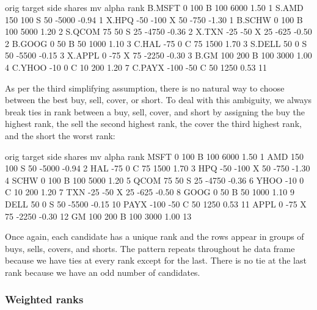 \documentclass{article}
\begin{document}
\begin{Schunk}
\begin{Soutput}
       orig target side shares    mv alpha rank
B.MSFT    0    100    B    100  6000  1.50    1
S.AMD   150    100    S     50 -5000 -0.94    1
X.HPQ   -50   -100    X     50  -750 -1.30    1
B.SCHW    0    100    B    100  5000  1.20    2
S.QCOM   75     50    S     25 -4750 -0.36    2
X.TXN   -25    -50    X     25  -625 -0.50    2
B.GOOG    0     50    B     50  1000  1.10    3
C.HAL   -75      0    C     75  1500  1.70    3
S.DELL   50      0    S     50 -5500 -0.15    3
X.APPL    0    -75    X     75 -2250 -0.30    3
B.GM    100    200    B    100  3000  1.00    4
C.YHOO  -10      0    C     10   200  1.20    7
C.PAYX -100    -50    C     50  1250  0.53   11
\end{Soutput}
\end{Schunk}

As per the third simplifying assumption, there is no natural way to
choose between the best buy, sell, cover, or short.  To deal with this
ambiguity, we always break ties in rank between a buy, sell, cover,
and short by assigning the buy the highest rank, the sell the second
highest rank, the cover the third highest rank, and the short the
worst rank:

\begin{Schunk}
\begin{Soutput}
     orig target side shares    mv alpha rank
MSFT    0    100    B    100  6000  1.50    1
AMD   150    100    S     50 -5000 -0.94    2
HAL   -75      0    C     75  1500  1.70    3
HPQ   -50   -100    X     50  -750 -1.30    4
SCHW    0    100    B    100  5000  1.20    5
QCOM   75     50    S     25 -4750 -0.36    6
YHOO  -10      0    C     10   200  1.20    7
TXN   -25    -50    X     25  -625 -0.50    8
GOOG    0     50    B     50  1000  1.10    9
DELL   50      0    S     50 -5500 -0.15   10
PAYX -100    -50    C     50  1250  0.53   11
APPL    0    -75    X     75 -2250 -0.30   12
GM    100    200    B    100  3000  1.00   13
\end{Soutput}
\end{Schunk}

Once again, each candidate has a unique rank and the rows appear in
groups of buys, sells, covers, and shorts.  The pattern repeats
throughout he data frame because we have ties at every rank except for
the last.  There is no tie at the last rank because we have an odd
number of candidates.

\subsubsection{Weighted ranks}
\end{document}
